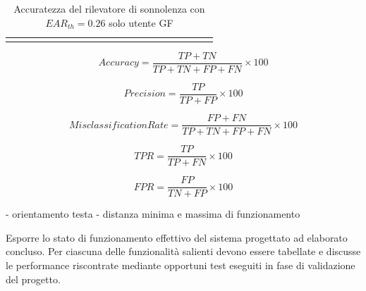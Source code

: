 \documentclass[12pt]{article}
\begin{document}
\begin{landscape}
\begin{table}[]
\begin{adjustbox}{width=1.4\textwidth}
\begin{tabular}{lllllllllllllllccllll}
				& & & & & & & & & & & & & & & \multicolumn{1}{l}{} & \multicolumn{1}{l}{} & & & &
			\end{tabular}
		\end{adjustbox}
		\caption{Accuratezza del rilevatore di sonnolenza con $EAR_{th}=0.26$ solo utente GF}
		\label{table:test}
	\end{table}
\end{landscape}

\begin{equation}
Accuracy = \frac{TP + TN}{TP + TN + FP + FN} \times 100
\end{equation}

\begin{equation}
Precision = \frac{TP}{TP + FP} \times 100
\end{equation}

\begin{equation}
MisclassificationRate = \frac{FP + FN}{TP + TN + FP + FN} \times 100
\end{equation}

\begin{equation}
TPR = \frac{TP}{TP + FN} \times 100
\end{equation}

\begin{equation}
FPR = \frac{FP}{TN + FP} \times 100
\end{equation}

\begin{center}
\end{center}

\iffalse
- orientamento testa
- distanza minima e massima di funzionamento

Esporre lo stato di funzionamento effettivo del sistema progettato ad elaborato concluso. Per ciascuna delle funzionalità salienti devono essere tabellate e discusse le performance riscontrate mediante opportuni test eseguiti in fase di validazione del progetto.\\
\end{document}

